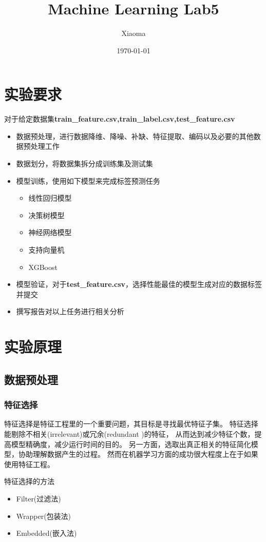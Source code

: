 \documentclass[12pt, a4paper, oneside]{ctexart}
\title{Machine Learning Lab5}
\author{Xiaoma}
\date{\today}
\begin{document}
\maketitle
\section{实验要求}
对于给定数据集\textbf{train\_feature.csv,train\_label.csv,test\_feature.csv}
\begin{itemize}
    \item 数据预处理，进行数据降维、降噪、补缺、特征提取、编码以及必要的其他数据预处理工作
    \item 数据划分，将数据集拆分成训练集及测试集
    \item 模型训练，使用如下模型来完成标签预测任务
    \begin{itemize}
        \item 线性回归模型
        \item 决策树模型
        \item 神经网络模型
        \item 支持向量机
        \item XGBoost
    \end{itemize}
    \item 模型验证，对于\textbf{test\_feature.csv}，选择性能最佳的模型生成对应的数据标签并提交
    \item 撰写报告对以上任务进行相关分析
\end{itemize}

\section{实验原理}
\subsection{数据预处理}
\subsubsection{特征选择}
特征选择是特征工程里的一个重要问题，其目标是寻找最优特征子集。
特征选择能剔除不相关(irrelevant)或冗余(redundant )的特征，
从而达到减少特征个数，提高模型精确度，减少运行时间的目的。
另一方面，选取出真正相关的特征简化模型，协助理解数据产生的过程。
然而在机器学习方面的成功很大程度上在于如果使用特征工程。

特征选择的方法
\begin{itemize}
    \item Filter(过滤法)
    \item Wrapper(包装法)
    \item Embedded(嵌入法)
\end{itemize}
\end{document}
